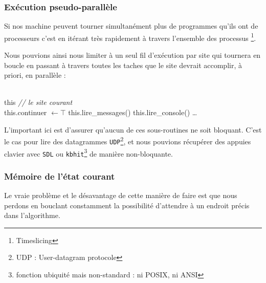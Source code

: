 \subsubsection{Exécution pseudo-parallèle}

Si nos machine peuvent tourner \og simultanément \fg{} plus de programmes qu'ils ont de processeurs c'est en itérant très rapidement à travers l'ensemble des processus \footnote {\og Timeslicing \fg{}}. 

Nous pouvions ainsi nous limiter à un seul fil d'exécution par site qui tournera en boucle en passant à travers toutes les taches que le site devrait accomplir, à priori, en parallèle :

\begin{algorithm}[H]
  \caption{$Site::Boucle()$}
  \Donnees
  {\\
    this \textit{// le site courant}\\
  }
  \Deb
  {
  	this.continuer $\leftarrow \top$ \;
	 {
	 	this.lire\_messages() \;
	 	this.lire\_console() \;
	 	\dots
	 }
  }	
\end{algorithm}

L'important ici est d'assurer qu'aucun de ces sous-routines ne soit bloquant. C'est le cas pour lire des datagrammes \texttt{UDP}\footnote{UDP : User-datagram protocole }, et nous pouvions récupérer des appuies clavier avec \texttt{SDL} ou \texttt{kbhit}\footnote{fonction ubiquité mais non-standard : ni POSIX, ni ANSI} de manière non-bloquante.

\subsubsection{Mémoire de l'état courant}
Le vraie problème et le désavantage de cette manière de faire est que nous perdons en bouclant constamment la possibilité d'attendre à un endroit précis dans l'algorithme. 